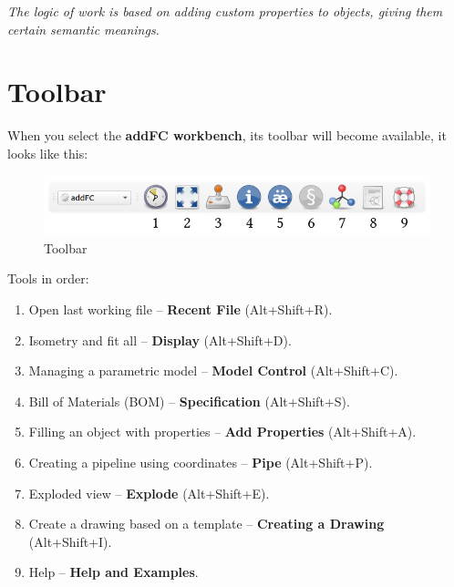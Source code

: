 \documentclass[a4paper,12pt]{article}
\begin{document}
\begin{center}\emph{The logic of work is based on adding custom properties to objects, giving them certain semantic meanings.}\end{center}





\section{Toolbar}

When you select the \textbf{addFC workbench}, its toolbar will become available, it looks like this:

\begin{figure}[htp]
	\centering
	\includegraphics[scale=0.8]{img/toolbar.png}
	\caption{Toolbar}
	\label{sec:toolbar}
\end{figure}

\begin{flushleft}Tools in order:\end{flushleft}
\begin{enumerate}
	\item Open last working file -- \textbf{Recent File} (Alt+Shift+R).\label{sec:1}
	\item Isometry and fit all -- \textbf{Display} (Alt+Shift+D).\label{sec:2}
	\item Managing a parametric model -- \textbf{Model Control} (Alt+Shift+C).\label{sec:3}
	\item Bill of Materials (BOM) -- \textbf{Specification} (Alt+Shift+S).\label{sec:4}
	\item Filling an object with properties -- \textbf{Add Properties} (Alt+Shift+A).\label{sec:5}
	\item Creating a pipeline using coordinates -- \textbf{Pipe} (Alt+Shift+P).\label{sec:6}
	\item Exploded view -- \textbf{Explode} (Alt+Shift+E).\label{sec:7}
	\item Create a drawing based on a template -- \textbf{Creating a Drawing} (Alt+Shift+I).\label{sec:8}
	\item Help -- \textbf{Help and Examples}.\label{sec:9}
\end{enumerate}
\end{document}

